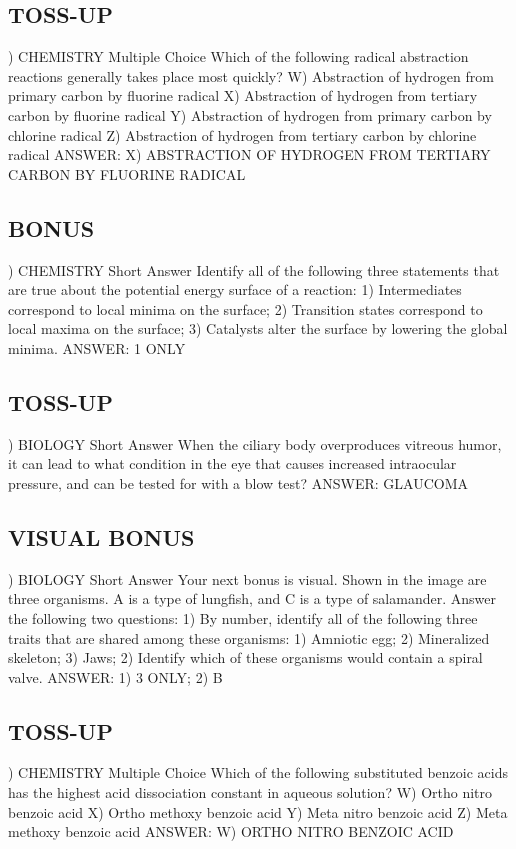 \documentclass{article}
\begin{document}
\subsection*{TOSS-UP}
) CHEMISTRY Multiple Choice Which of the following radical abstraction reactions generally takes place most quickly?
\noindent W) Abstraction of hydrogen from primary carbon by fluorine radical
\noindent X) Abstraction of hydrogen from tertiary carbon by fluorine radical
\noindent Y) Abstraction of hydrogen from primary carbon by chlorine radical
\noindent Z) Abstraction of hydrogen from tertiary carbon by chlorine radical
\noindent ANSWER: X) ABSTRACTION OF HYDROGEN FROM TERTIARY CARBON BY FLUORINE RADICAL

\subsection*{BONUS}
) CHEMISTRY Short Answer Identify all of the following three statements that are true about the potential energy surface of a reaction: 1) Intermediates correspond to local minima on the surface; 2) Transition states correspond to local maxima on the surface; 3) Catalysts alter the surface by lowering the global minima.
\noindent ANSWER: 1 ONLY

\subsection*{TOSS-UP}
) BIOLOGY Short Answer When the ciliary body overproduces vitreous humor, it can lead to what condition in the eye that causes increased intraocular pressure, and can be tested for with a blow test?
\noindent ANSWER: GLAUCOMA

\subsection*{VISUAL BONUS}
) BIOLOGY Short Answer Your next bonus is visual. Shown in the image are three organisms. A is a type of lungfish, and C is a type of salamander. Answer the following two questions: 1) By number, identify all of the following three traits that are shared among these organisms: 1) Amniotic egg; 2) Mineralized skeleton; 3) Jaws; 2) Identify which of these organisms would contain a spiral valve.
\noindent ANSWER: 1) 3 ONLY; 2) B

\subsection*{TOSS-UP}
) CHEMISTRY Multiple Choice Which of the following substituted benzoic acids has the highest acid dissociation constant in aqueous solution?
\noindent W) Ortho nitro benzoic acid
\noindent X) Ortho methoxy benzoic acid
\noindent Y) Meta nitro benzoic acid
\noindent Z) Meta methoxy benzoic acid
\noindent ANSWER: W) ORTHO NITRO BENZOIC ACID
\end{document}
